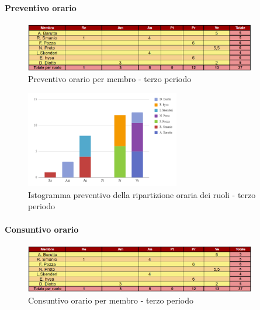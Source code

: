 \paragraph*{Preventivo orario} \hspace{1pt}

\begin{figure}[H]
    \centering
    \includegraphics[width=0.9\textwidth]{../Images/preventivoOrario3Periodo.png}
    \caption{Preventivo orario per membro - terzo periodo}
    \label{fig:Preventivo_orario_3}
\end{figure}

\begin{figure}[H]
    \centering
    \includegraphics[width=0.6\textwidth]{../Images/preventivoDivisioneRuoli3Periodo.png}
    \caption{Istogramma preventivo della ripartizione oraria dei ruoli - terzo periodo}
    \label{fig:Preventivo_ripartizione_oraria_3}
\end{figure}

\paragraph*{Consuntivo orario } \hspace{1pt}

\begin{figure}[H]
    \centering
    \includegraphics[width=0.9\textwidth]{../Images/consuntivoOrario3Periodo.png}
    \caption{Consuntivo orario per membro - terzo periodo}
    \label{fig:Constuntivo_orario_3}
\end{figure}

